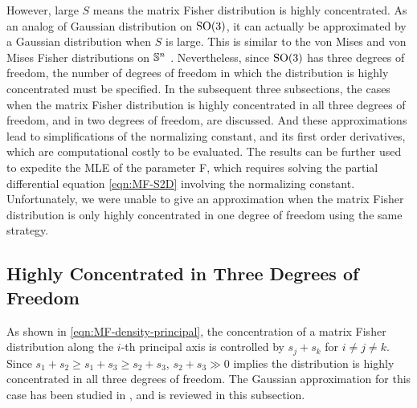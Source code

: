 However, large $S$ means the matrix Fisher distribution is highly concentrated.
As an analog of Gaussian distribution on $\mathrm{SO}(3)$, it can actually be approximated by a Gaussian distribution when $S$ is large.
This is similar to the von Mises and von Mises Fisher distributions on $\mathbb{S}^n$ \cite{mardia2009directional}.
Nevertheless, since $\mathrm{SO}(3)$ has three degrees of freedom, the number of degrees of freedom in which the distribution is highly concentrated must be specified.
In the subsequent three subsections, the cases when the matrix Fisher distribution is highly concentrated in all three degrees of freedom, and in two degrees of freedom, are discussed.
And these approximations lead to simplifications of the normalizing constant, and its first order derivatives, which are computational costly to be evaluated.
The results can be further used to expedite the MLE of the parameter F, which requires solving the partial differential equation \eqref{eqn:MF-S2D} involving the normalizing constant.
Unfortunately, we were unable to give an approximation when the matrix Fisher distribution is only highly concentrated in one degree of freedom using the same strategy.

\subsection{Highly Concentrated in Three Degrees of Freedom}

As shown in \eqref{eqn:MF-density-principal}, the concentration of a matrix Fisher distribution along the $i$-th principal axis is controlled by $s_j+s_k$ for $i\neq j\neq k$.
Since $s_1+s_2 \geq s_1+s_3 \geq s_2+s_3$, $s_2+s_3 \gg 0$ implies the distribution is highly concentrated in all three degrees of freedom.
The Gaussian approximation for this case has been studied in \cite{lee2018bayesian-b}, and is reviewed in this subsection.

